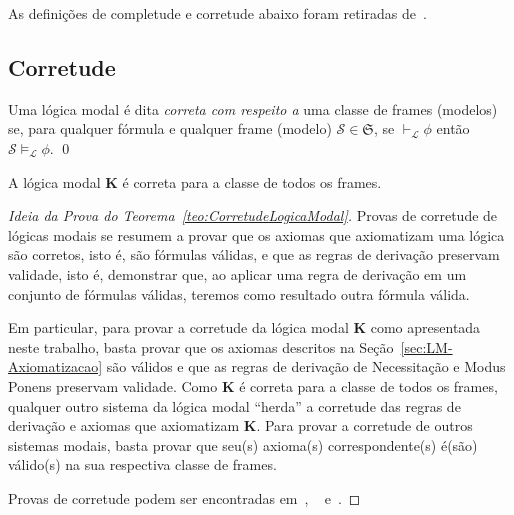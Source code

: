         As definições de completude e corretude abaixo foram retiradas de~.

        \subsection{Corretude}
            \label{subsec:Corretude}

            \sloppy
            \begin{definicao}[Corretude]
                \label{def:Corretude}
                Uma lógica modal  é dita \textit{correta com respeito a} uma classe de frames (modelos) 
                se, para qualquer fórmula \PHI e qualquer frame (modelo) \(\mathcal{S} \in \mathfrak{S}\), se \(\vdash_{\mathcal{L}} \phi\)
                então \(\mathcal{S} \vDash_{\mathcal{L}} \phi\). \qed
            \end{definicao}

            \begin{teorema}
                \label{teo:CorretudeLogicaModal}
                A lógica modal \textbf{K} é correta para a classe de todos os frames.
            \end{teorema}

            \begin{proof}[Ideia da Prova do Teorema~\ref{teo:CorretudeLogicaModal}]
                Provas de corretude de lógicas modais se resumem a provar que os axiomas que axiomatizam uma lógica são corretos,
                isto é, são fórmulas válidas, e que as regras de derivação preservam validade, isto é, demonstrar que, ao aplicar uma
                regra de derivação em um conjunto de fórmulas válidas, teremos como resultado outra fórmula válida.

                Em particular, para provar a corretude da lógica modal \textbf{K} como apresentada neste trabalho,
                basta provar que os axiomas descritos na Seção~\ref{sec:LM-Axiomatizacao} são válidos e que as regras de derivação
                de Necessitação e Modus Ponens preservam validade.
                Como \textbf{K} é correta para a classe de todos os frames, qualquer outro sistema da lógica modal ``herda'' a corretude
                das regras de derivação e axiomas que axiomatizam \textbf{K}. Para provar a corretude de outros sistemas modais, basta provar
                que seu(s) axioma(s) correspondente(s) é(são) válido(s) na sua respectiva classe de frames.

                Provas de corretude podem ser encontradas em~, ~ e~.
            \end{proof}

